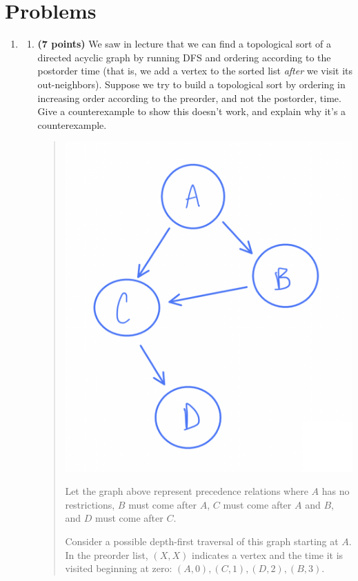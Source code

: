 \documentclass[11pt]{article}
\begin{document}

\section*{Problems}

\begin{enumerate}
\item 
\begin{enumerate}
\item 
{\bf (7 points)}
We saw in lecture that we can find a topological sort of a directed acyclic graph by running DFS
and ordering according to the postorder time
(that is, we add a vertex to the sorted list \emph{after} we visit its out-neighbors).
Suppose we try to build a topological sort by ordering in increasing order according to the preorder, and 
not the postorder, time.  Give a counterexample to show this doesn't work, and explain why it's a counterexample.  

\begin{quote}
  \color{purple}
  \includegraphics[width=0.6\linewidth]{"./pics/q1_graph.png"}

  \medskip
  Let the graph above represent precedence relations where $A$ has no restrictions, $B$ must come after $A$, $C$ must come after $A$ and $B$, and $D$ must come after $C$. 

  \medskip
  Consider a possible depth-first traversal of this graph starting at $A$. In the preorder list, $(X, X)$ indicates a vertex and the time it is visited beginning at zero: $(A, 0), (C, 1), (D, 2), (B, 3)$. 


\end{quote}
\end{enumerate}
\end{enumerate}
\end{document}
